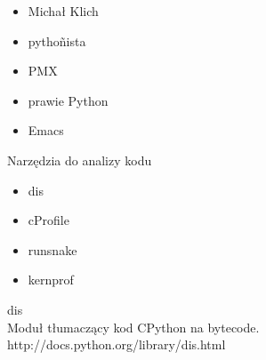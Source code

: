 \documentclass{beamer}
\begin{document}
\center

\begin{frame}
\begin{itemize}
\pause \item Michał Klich
\pause \item pytho\~nista %
\pause \item PMX
\pause \item prawie Python
\pause \item Emacs %
\end{itemize}
\end{frame}

\begin{frame}
\end{frame}

\begin{frame}
Narzędzia do analizy kodu
\begin{itemize}
\item dis %
\item cProfile %
\item runsnake %
\item kernprof %
\end{itemize}
\end{frame}

\begin{frame}
dis \\
Moduł tłumaczący kod CPython na bytecode. \\
http://docs.python.org/library/dis.html
\end{frame}
\end{document}
